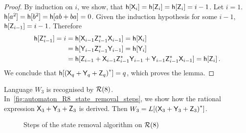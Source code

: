 \begin{proof}
    By induction on $i$, we show, that ${\mathsf{h}[{\mathsf{X}}_i]} = {\mathsf{h}[{\mathsf{Z}}_i]} = {\mathsf{h}[{\mathsf{Z}}_i]} = i-1$. Let $i=1$. ${\mathsf{h}[a^2]} = {\mathsf{h}[b^2]} = {\mathsf{h}[ab+ba]} = 0$. Given the induction hypothesis for some $i - 1$,
    ${\mathsf{h}[{\mathsf{Z}}_{i-1}]} = i-1$. Therefore
    \begin{align*}
        {\mathsf{h}[{\mathsf{Z}}_{i-1}^*]} = i &= {\mathsf{h}[{\mathsf{X}}_{i-1} {\mathsf{Z}}_{i-1}^* {\mathsf{X}}_{i-1}]} = {\mathsf{h}[{\mathsf{X}}_i]} \\
        &= {\mathsf{h}[{\mathsf{Y}}_{i-1} {\mathsf{Z}}_{i-1}^* {\mathsf{Y}}_{i-1}]} = {\mathsf{h}[{\mathsf{Y}}_i]} \\
        &= {\mathsf{h}[{\mathsf{Z}}_{i-1} + {\mathsf{X}}_{i-1} {\mathsf{Z}}_{i-1}^* {\mathsf{Y}}_{i-1} + {\mathsf{Y}}_{i-1} {\mathsf{Z}}_{i-1}^* {\mathsf{X}}_{i-1}]} = {\mathsf{h}[{\mathsf{Z}}_i]} \, .
    \end{align*}
    We conclude that ${\mathsf{h}[{({\mathsf{X}}_q + {\mathsf{Y}}_q + {\mathsf{Z}}_q)}^*]} = q$, which proves the lemma.
\end{proof}

\begin{example}
    Language $W_3$ is recognised by ${\mathcal{R}}(8)$. In~\autoref*{fig:automaton_R8_state_removal_steps}, we show how the rational expression ${\mathsf{X}}_3 + {\mathsf{Y}}_3 + {\mathsf{Z}}_3$ is derived. Then $W_3 = L[{({\mathsf{X}}_3 + {\mathsf{Y}}_3 + {\mathsf{Z}}_3)}^*]$.

    \begin{figure}[h]%
        \centerline{
            \hspace{-15mm}%
            \qquad
            \qquad
            \subfloat[]{%
                }
        }
        \vspace{5mm}
        \centerline{
            \hspace{-15mm}%
            \subfloat[]{%
                }%
            \quad
            \subfloat[]{%
                }
            \quad
        }
        \vspace{5mm}
        \centerline{
            \hspace{-15mm}%
            \subfloat[]{%
                }%
            \quad
            \quad
        }
        \caption{Steps of the state removal algorithm on ${\mathcal{R}}(8)$}\label{fig:automaton_R8_state_removal_steps}%
    \end{figure}
\end{example}

